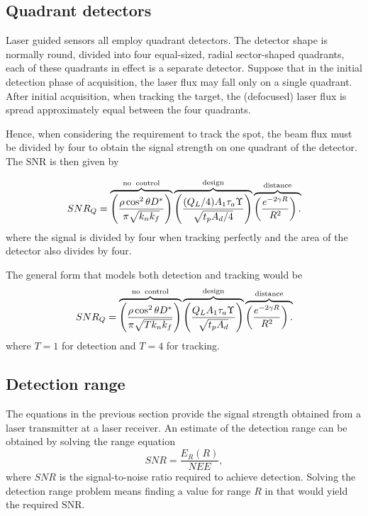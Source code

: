 \subsection{Quadrant detectors}
\noindent
Laser guided sensors all employ quadrant detectors.  The detector shape is normally round, divided into four equal-sized, radial sector-shaped quadrants, each of these quadrants in effect is a separate detector. Suppose that in the initial detection phase of acquisition, the laser flux may fall only on a single quadrant.  After initial acquisition, when tracking the target, the (defocused) laser flux is spread approximately equal between the four quadrants.

Hence, when considering the requirement to track the spot, the beam flux must be divided by four to obtain the signal strength on one quadrant of the detector. The SNR is then given by

\begin{equation}
SNR_Q=
\overbrace{
\left(\frac{\rho \cos^2\theta D^\ast }{\pi \sqrt{k_nk_f}}\right)
}^{\rm no\;\;control}
\overbrace{
\left(\frac{(Q_L/4) A_1 \tau_a \Upsilon}{\sqrt{t_p A_d/4}}\right)
}^{\rm design}
\overbrace{
\left(\frac{e^{-2\gamma R} }{R^2}\right).\\
}^{\rm distance}
\label{lrfd2f}
\end{equation}
where the signal is divided by four when tracking perfectly and the area of the detector also divides by four.


The general form that models both detection and tracking would be
\begin{equation}
SNR_Q=
\overbrace{
\left(\frac{\rho \cos^2\theta D^\ast }{\pi \sqrt{T k_nk_f}}\right)
}^{\rm no\;\;control}
\overbrace{
\left(\frac{Q_L A_1 \tau_a \Upsilon}{\sqrt{t_p A_d}}\right)
}^{\rm design}
\overbrace{
\left(\frac{e^{-2\gamma R} }{R^2}\right).\\
}^{\rm distance}
\label{lrfd2g}
\end{equation}
where $T=1$ for detection and $T=4$ for tracking.




\subsection{Detection range}
\noindent
The equations in the previous section provide the signal strength obtained from a laser transmitter at a laser receiver. An estimate of the detection range can be obtained by solving the range equation
\begin{equation}
SNR=\frac{E_R(R)}{NEE},
\label{eq:laserdetectionsnrerror}
\end{equation}
where $SNR$ is the signal-to-noise ratio required to achieve detection. Solving the detection range problem means finding a value for range $R$ in  that would yield the required SNR. 


